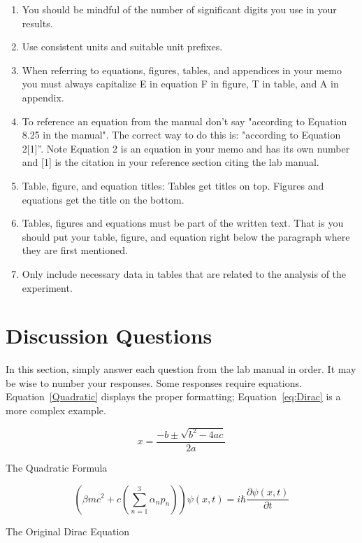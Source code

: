 \documentclass[11pt,a4paper]{article}
\begin{document}
\begin{enumerate} %
  \item You should be mindful of the number of significant digits you use in your results.
  \item Use consistent units and suitable unit prefixes.
  \item When referring to equations, figures, tables, and appendices in your memo you must always capitalize E in equation F in figure, T in table, and A in appendix.
  \item To reference an equation from the manual don't say "according to Equation 8.25 in the manual". The correct way to do this is: "according to Equation 2[1]”. Note Equation 2 is an equation in your memo and has its own number and [1] is the citation in your reference section citing the lab manual.
  \item Table, figure, and equation titles: Tables get titles on top. Figures and equations get the title on the bottom.
  \item Tables, figures and equations must be part of the written text. That is you should put your table, figure, and equation right below the paragraph where they are first mentioned.
  \item Only include necessary data in tables that are related to the analysis of the experiment.
\end{enumerate}

\section*{Discussion Questions}
In this section, simply answer each question from the lab manual in order. It may be wise to number your responses. Some responses require equations. Equation~\ref{Quadratic} displays the proper formatting; Equation~\ref{eq:Dirac} is a more complex example.

\begin{eqfloat}[!htb]
\begin{equation*}
x=\frac{-b\pm\sqrt{b^2-4ac}}{2a}
\end{equation*}
\caption{The Quadratic Formula}\label{Quadratic}
\end{eqfloat}
	
\begin{eqfloat}
\begin{equation*}
\left (
    \beta mc^2 + c 
       \left ( 
           \sum_{n=1}^3 \alpha_n p_n 
       \right )
\right )
\psi(x,t)
=
i \hbar \dfrac{\partial \psi(x,t) }{\partial t}
\end{equation*}
\caption{The Original Dirac Equation}\label{eq:Dirac}
\end{eqfloat}
\end{document}
